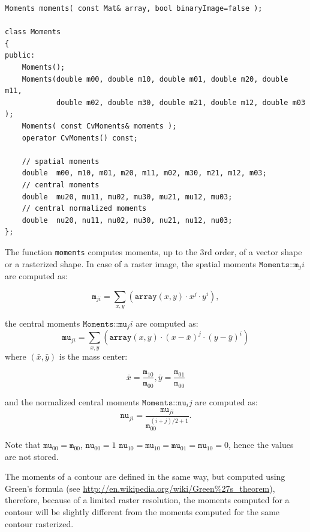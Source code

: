 \begin{lstlisting}
Moments moments( const Mat& array, bool binaryImage=false );

class Moments
{
public:
    Moments();
    Moments(double m00, double m10, double m01, double m20, double m11,
            double m02, double m30, double m21, double m12, double m03 );
    Moments( const CvMoments& moments );
    operator CvMoments() const;
    
    // spatial moments
    double  m00, m10, m01, m20, m11, m02, m30, m21, m12, m03;
    // central moments
    double  mu20, mu11, mu02, mu30, mu21, mu12, mu03;
    // central normalized moments
    double  nu20, nu11, nu02, nu30, nu21, nu12, nu03;
};
\end{lstlisting}
\begin{description}
\end{description}

The function \texttt{moments} computes moments, up to the 3rd order, of a vector shape or a rasterized shape.
In case of a raster image, the spatial moments $\texttt{Moments::m}_ji$ are computed as:

\[\texttt{m}_{ji}=\sum_{x,y} (\texttt{array}(x,y) \cdot x^j \cdot y^i),\]

the central moments $\texttt{Moments::mu}_ji$ are computed as:
\[\texttt{mu}_{ji}=\sum_{x,y} (\texttt{array}(x,y) \cdot (x - \bar{x})^j \cdot (y - \bar{y})^i)\]
where $(\bar{x}, \bar{y})$ is the mass center:

\[
\bar{x}=\frac{\texttt{m}_{10}}{\texttt{m}_{00}}, \bar{y}=\frac{\texttt{m}_{01}}{\texttt{m}_{00}}
\]

and the normalized central moments $\texttt{Moments::nu}_ij$ are computed as:
\[\texttt{nu}_{ji}=\frac{\texttt{mu}_{ji}}{\texttt{m}_{00}^{(i+j)/2+1}}.\]

Note that $\texttt{mu}_{00}=\texttt{m}_{00}$, $\texttt{nu}_{00}=1$ $\texttt{nu}_{10}=\texttt{mu}_{10}=\texttt{mu}_{01}=\texttt{mu}_{10}=0$, hence the values are not stored.

The moments of a contour are defined in the same way, but computed using Green's formula
(see \url{http://en.wikipedia.org/wiki/Green%27s_theorem}), therefore, because of a limited raster resolution, the moments computed for a contour will be slightly different from the moments computed for the same contour rasterized.

